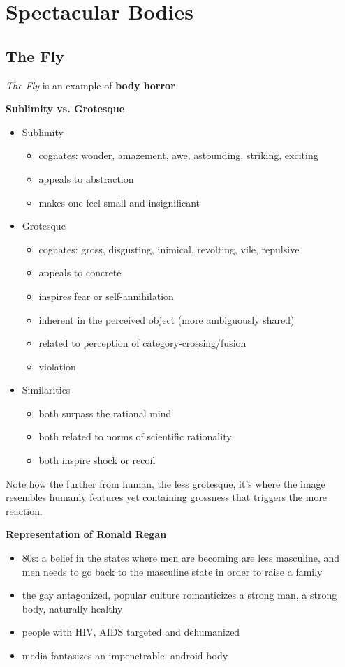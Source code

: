 \documentclass[11pt,fleqn]{book}
\begin{document}
\section{Spectacular Bodies}
\subsection{The Fly}
\textit{The Fly} is an example of \textbf{body horror}

\textbf{Sublimity vs. Grotesque}
\begin{itemize}
    \item Sublimity
    \begin{itemize}
        \item cognates: wonder, amazement, awe, astounding, striking, exciting
        \item appeals to abstraction
        \item makes one feel small and insignificant
    \end{itemize}
    \item Grotesque
    \begin{itemize}
        \item cognates: gross, disgusting, inimical, revolting, vile, repulsive
        \item appeals to concrete
        \item inspires fear or self-annihilation
        \item inherent in the perceived object (more ambiguously shared)
        \item related to perception of category-crossing/fusion
        \item violation
    \end{itemize}
    \item Similarities
    \begin{itemize}
        \item both surpass the rational mind
        \item both related to norms of scientific rationality
        \item both inspire shock or recoil
    \end{itemize}
\end{itemize}
\begin{remark}
    Note how the further from human, the less grotesque, it's where the image resembles humanly features yet containing grossness that triggers the more reaction.
\end{remark}
\textbf{Representation of Ronald Regan}
\begin{itemize}
    \item 80s: a belief in the states where men are becoming are less masculine, and men needs to go back to the masculine state in order to raise a family
    \item the gay antagonized, popular culture romanticizes a strong man, a strong body, naturally healthy 
    \item people with HIV, AIDS targeted and dehumanized
    \item media fantasizes an impenetrable, android body
\end{itemize}
\end{document}

